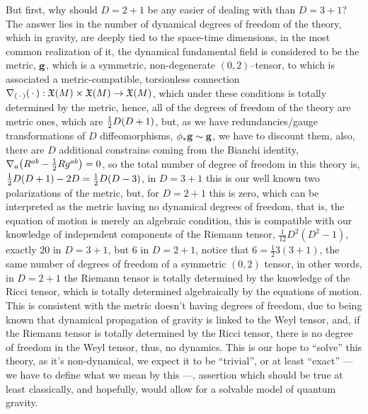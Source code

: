 But first, why should $D=2+1$ be any easier of dealing with than $D=3+1$? The answer lies in the number of dynamical degrees of freedom of the theory, which in gravity, 
are deeply tied to the space-time dimensions, in the most common realization of it, the dynamical fundamental field is considered to be the metric, $\vb g$, 
which is a symmetric, non-degenerate $(0,2)$--tensor, to which is associated a metric-compatible, torsionless connection $\nabla_{\qty(\,\cdot\,)}\qty(\,\cdot\,):\mathfrak X\qty(M)\times \mathfrak X\qty(M)\rightarrow\mathfrak X(M)$, 
which under these conditions is totally determined by the metric, hence, all of the degrees of freedom of the theory are metric ones, which are $\frac12D\qty(D+1)$, but, as we have redundancies/gauge 
transformations of $D$ diffeomorphisms, $\phi_\ast\vb g\sim\vb g$, we have to discount them, also, there are $D$ additional constrains coming from the Bianchi identity, $\nabla_a\qty(R^{ab}-\frac12 Rg^{ab})=0$, 
so the total number of degree of freedom in this theory is, $\frac12D\qty(D+1)-2D=\frac12D\qty(D-3)$,
in $D=3+1$ this is our well known two polarizations of the 
metric, but, for $D=2+1$ this is zero, which can be interpreted as the metric having no dynamical degrees of freedom, that is, the equation of motion 
is merely an algebraic condition, this is compatible with our knowledge of independent components of the Riemann tensor, $\frac{1}{12}D^2(D^2-1)$, exactly $20$ 
in $D=3+1$, but $6$ in $D=2+1$, notice that $6=\frac123(3+1)$, the same number of degrees of freedom of a symmetric $(0,2)$ tensor, in other words, 
in $D=2+1$ the Riemann tensor is totally determined by the knowledge of the Ricci tensor, which is totally determined algebraically by the equations of motion. 
This is consistent with the metric doesn't having degrees 
of freedom, due to being known that dynamical propagation of gravity is linked to the Weyl tensor, and, if the Riemann tensor is totally determined by the 
Ricci tensor, there is no degree of freedom in the Weyl tensor, thus, no dynamics.
This is our hope to ``solve'' this theory, as it's non-dynamical, we expect it to be ``trivial'', or at least ``exact'' --- we have to define what we mean by this ---, 
assertion which should be true at least classically, and hopefully, would allow for a solvable model of quantum gravity.